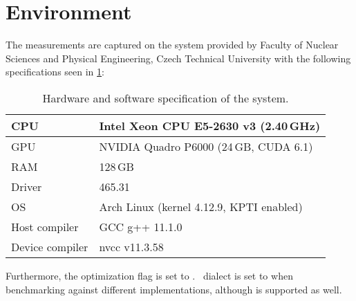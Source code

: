 \section{Environment}

The measurements are captured on the  system provided by Faculty of Nuclear Sciences and Physical Engineering, Czech Technical University with the following specifications seen in \cref{table:env-gp1}:

\begin{table}[H]
  \centering
  \begin{tabular}{ | l | l | }
    \hline
    CPU             & Intel Xeon CPU E5-2630 v3 (2.40\,GHz)    \\
    \hline
    GPU             & NVIDIA Quadro P6000 (24\,GB, CUDA 6.1)   \\
    \hline
    RAM             & 128\,GB                                  \\
    \hline
    Driver          & 465.31                                   \\
    \hline
    OS              & Arch Linux (kernel 4.12.9, KPTI enabled) \\
    \hline
    Host compiler   & GCC g++ 11.1.0                           \\
    \hline
    Device compiler & nvcc v11.3.58                            \\
    \hline
  \end{tabular}
  \caption{Hardware and software specification of the  system.}
  \label{table:env-gp1}
\end{table}

Furthermore, the optimization flag is set to . \CC\ dialect is set to  when benchmarking against different implementations, although  is supported as well.